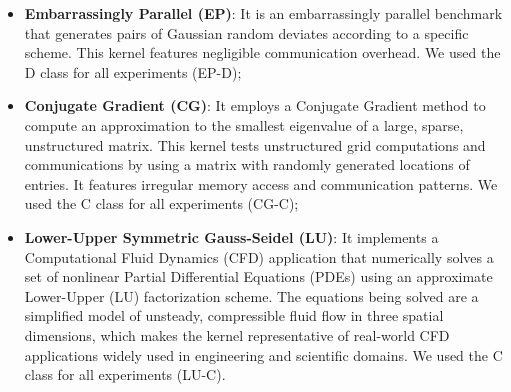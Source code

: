 \documentclass[conference]{IEEEtran}
\begin{document}
\begin{itemize}
  \item \textbf{Embarrassingly Parallel (EP)}: It is an embarrassingly parallel benchmark that generates pairs of Gaussian random deviates according to a specific scheme. This kernel features negligible communication overhead. We used the D class for all experiments (EP-D);

  \item \textbf{Conjugate Gradient (CG)}: It employs a Conjugate Gradient method to compute an approximation to the smallest eigenvalue of a large, sparse, unstructured matrix. This kernel tests unstructured grid computations and communications by using a matrix with randomly generated locations of entries. It features irregular memory access and communication patterns. We used the C class for all experiments (CG-C);
  
  \item \textbf{Lower-Upper Symmetric Gauss-Seidel (LU)}: It implements a Computational Fluid Dynamics (CFD) application that numerically solves a set of nonlinear Partial Differential Equations (PDEs) using an approximate Lower-Upper (LU) factorization scheme. The equations being solved are a simplified model of unsteady, compressible fluid flow in three spatial dimensions, which makes the kernel representative of real-world CFD applications widely used in engineering and scientific domains. We used the C class for all experiments (LU-C).
\end{itemize}


\end{document}
